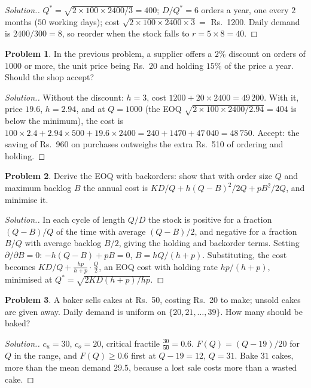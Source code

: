 \documentclass[11pt,a4paper]{article}
\numberwithin{equation}{section}
\theoremstyle{definition}
\newtheorem{problemx}{Problem}[subsection]
\newenvironment{problem}{\begin{problemx}}{\end{problemx}}
\newenvironment{solution}
  {\renewcommand{\qedsymbol}{}\begin{proof}[\textit{Solution}.]}
  {\end{proof}}
\begin{document}
\begin{solution}
$Q^* = \sqrt{2 \times 100 \times 2400/3} = 400$; $D/Q^* = 6$ orders a year, one every $2$ months ($50$ working days); cost $\sqrt{2 \times 100 \times 2400 \times 3} =$ Rs.~1200. Daily demand is $2400/300 = 8$, so reorder when the stock falls to $r = 5 \times 8 = 40$.
\end{solution}

\begin{problem}
In the previous problem, a supplier offers a $2\%$ discount on orders of $1000$ or more, the unit price being Rs.~20 and holding $15\%$ of the price a year. Should the shop accept?
\end{problem}

\begin{solution}
Without the discount: $h = 3$, cost $1200 + 20 \times 2400 = 49\,200$. With it, price $19.6$, $h = 2.94$, and at $Q = 1000$ (the EOQ $\sqrt{2 \times 100 \times 2400/2.94} = 404$ is below the minimum), the cost is $100 \times 2.4 + 2.94 \times 500 + 19.6 \times 2400 = 240 + 1470 + 47\,040 = 48\,750$. Accept: the saving of Rs.~960 on purchases outweighs the
extra Rs.~510 of ordering and holding.
\end{solution}

\begin{problem}
Derive the EOQ with backorders: show that with order size $Q$ and maximum backlog $B$ the annual cost is $KD/Q + h(Q - B)^2/2Q + pB^2/2Q$, and minimise it.
\end{problem}

\begin{solution}
In each cycle of length $Q/D$ the stock is positive for a fraction $(Q - B)/Q$ of the time with average $(Q - B)/2$, and negative for a fraction $B/Q$ with average backlog $B/2$, giving the holding and backorder terms. Setting $\partial/\partial B = 0$: $-h(Q - B) + pB = 0$, $B = hQ/(h + p)$. Substituting, the cost becomes
$KD/Q + \frac{hp}{h + p}\cdot\frac Q2$, an EOQ cost with holding rate $hp/(h + p)$, minimised at $Q^* = \sqrt{2KD(h + p)/hp}$.
\end{solution}

\begin{problem}
A baker sells cakes at Rs.~50, costing Rs.~20 to make; unsold cakes are given away. Daily demand is uniform on $\{20, 21, \ldots, 39\}$. How many should be baked?
\end{problem}

\begin{solution}
$c_u = 30$, $c_o = 20$, critical fractile $\frac{30}{50} = 0.6$. $F(Q) = (Q - 19)/20$ for $Q$ in the range, and $F(Q) \geq 0.6$ first at $Q - 19 = 12$, $Q = 31$. Bake $31$ cakes, more than the mean demand $29.5$, because a lost sale costs more than a wasted cake.
\end{solution}
\end{document}
